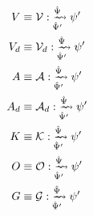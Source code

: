 \begin{align}
    \mthClassicV  &\equiv \mthScientificV  \mthNeuralQuasiBayesianUpdateConviction{\mthNQSpace}{\mthNQSpace'} \mthVirtualConviction' \\
    \mthClassicVd &\equiv \mthScientificVd \mthNeuralQuasiBayesianUpdateConviction{\mthNQSpace}{\mthNQSpace'} \mthVirtualConviction' \\
    \mthClassicA  &\equiv \mthScientificA  \mthNeuralQuasiBayesianUpdateConviction{\mthNQSpace}{\mthNQSpace'} \mthVirtualConviction' \\
    \mthClassicAd &\equiv \mthScientificAd \mthNeuralQuasiBayesianUpdateConviction{\mthNQSpace}{\mthNQSpace'} \mthVirtualConviction' \\
    \mthClassicK  &\equiv \mthScientificK  \mthNeuralQuasiBayesianUpdateConviction{\mthNQSpace}{\mthNQSpace'} \mthVirtualConviction' \\
    \mthClassicO  &\equiv \mthScientificO  \mthNeuralQuasiBayesianUpdateConviction{\mthNQSpace}{\mthNQSpace'} \mthVirtualConviction' \\
    \mthClassicG  &\equiv \mthScientificG  \mthNeuralQuasiBayesianUpdateConviction{\mthNQSpace}{\mthNQSpace'} \mthVirtualConviction'
\end{align}

